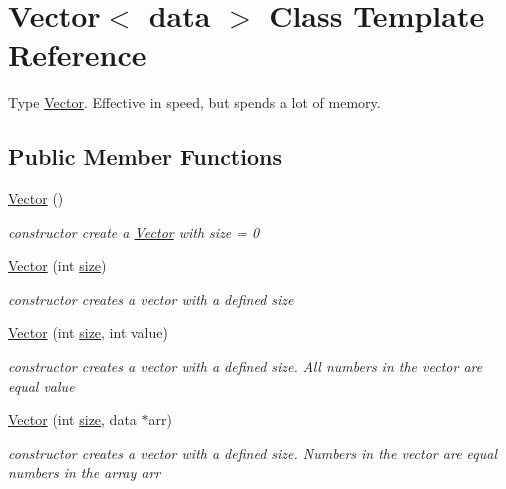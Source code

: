 \hypertarget{classVector}{}\section{Vector$<$ data $>$ Class Template Reference}
\label{classVector}


Type \hyperlink{classVector}{Vector}. Effective in speed, but spends a lot of memory.  


\subsection*{Public Member Functions}
\begin{DoxyCompactItemize}
\item 
\mbox{\label{classVector_ae1d85ad40c4838dca7b39d4083a16c8f}} 
\hyperlink{classVector_ae1d85ad40c4838dca7b39d4083a16c8f}{Vector} ()
\begin{DoxyCompactList}\small\item\em constructor  create a \hyperlink{classVector}{Vector} with size = 0 \end{DoxyCompactList}\item 
\hyperlink{classVector_aba82b0f3e3fd3d17bf2d19b04a8361b7}{Vector} (int \hyperlink{classVector_a81b1d973485244101caf8e901b4a03d9}{size})
\begin{DoxyCompactList}\small\item\em constructor  creates a vector with a defined size \end{DoxyCompactList}\item 
\hyperlink{classVector_aede0f97bf9e72a66047d90ad8246ded1}{Vector} (int \hyperlink{classVector_a81b1d973485244101caf8e901b4a03d9}{size}, int value)
\begin{DoxyCompactList}\small\item\em constructor  creates a vector with a defined size. All numbers in the vector are equal value \end{DoxyCompactList}\item 
\hyperlink{classVector_a90cdb4e859d9802e381050fa5ef7b1b7}{Vector} (int \hyperlink{classVector_a81b1d973485244101caf8e901b4a03d9}{size}, data $\ast$arr)
\begin{DoxyCompactList}\small\item\em constructor  creates a vector with a defined size. Numbers in the vector are equal numbers in the array arr \end{DoxyCompactList}\item 

\end{DoxyCompactItemize}
